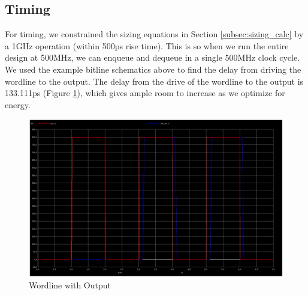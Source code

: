 \documentclass[a4paper]{article}
\begin{document}
%
%


\subsection{Timing}
For timing, we constrained the sizing equations in Section \ref{subsec:sizing_calc} by a 1GHz operation (within 500ps rise time). This is so when we run the entire design at 500MHz, we can enqueue and dequeue in a single 500MHz clock cycle. We used the example bitline schematics above to find the delay from driving the wordline to the output. The delay from the drive of the wordline to the output is 133.111ps (Figure \ref{fig:ioTiming}), which gives ample room to increase as we optimize for energy.

\begin{figure}[H]
	\centering
	\includegraphics[scale=0.2]{exampleBitlineIOTiming}
	\caption{Wordline with Output}
	\label{fig:ioTiming}
\end{figure}
\end{document}
